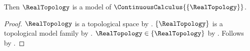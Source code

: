 


\begin{theorem}\label{closed_calculus_model_small_probe}
    Then $\RealTopology$ is a model of $\ContinuousCalculus{\{\RealTopology\}}$.
\end{theorem}
\begin{proof}
    $\RealTopology$ is a topological space by .
    $\{\RealTopology\}$ is a topological model family by .
    $\RealTopology\in\{\RealTopology\}$ by .
    Follows by .
\end{proof}
